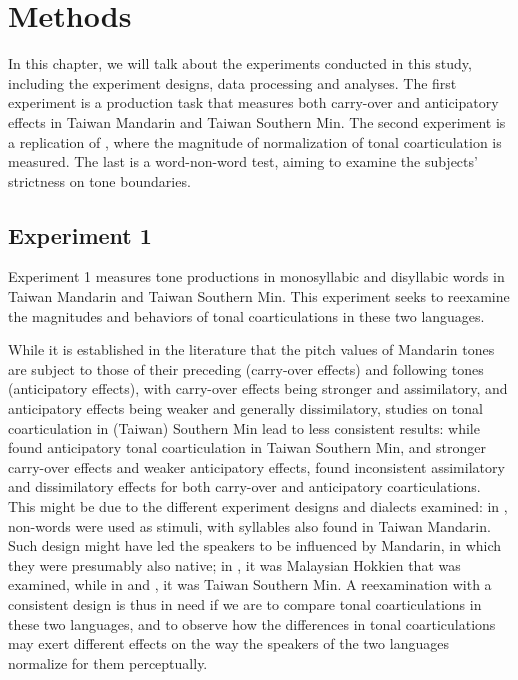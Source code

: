 \chapter{Methods}\label{chapter:Methods}

In this chapter, we will talk about the experiments conducted in this study, including the experiment designs, data processing and analyses. The first experiment is a production task that measures both carry-over and anticipatory effects in Taiwan Mandarin and Taiwan Southern Min. The second experiment is a replication of \cite{Zhangetal2022}, where the magnitude of normalization of tonal coarticulation is measured. The last is a word-non-word test, aiming to examine the subjects' strictness on tone boundaries.


\section{Experiment 1}
Experiment 1 measures tone productions in monosyllabic and disyllabic words in Taiwan Mandarin and Taiwan Southern Min. This experiment seeks to reexamine the magnitudes and behaviors of tonal coarticulations in these two languages.

While it is established in the literature that the pitch values of Mandarin tones are subject to those of their preceding (carry-over effects) and following tones (anticipatory effects), with carry-over effects being stronger and assimilatory, and anticipatory effects being weaker and generally dissimilatory, studies on tonal coarticulation in (Taiwan) Southern Min lead to less consistent results: while \cite{Peng1997} found anticipatory tonal coarticulation in Taiwan Southern Min, and \cite{Wang2002} stronger carry-over effects and weaker anticipatory effects, \cite{ChangHsieh2012} found inconsistent assimilatory and dissimilatory effects for both carry-over and anticipatory coarticulations. This might be due to the different experiment designs and dialects examined: in \cite{Wang2002}, non-words were used as stimuli, with syllables also found in Taiwan Mandarin. Such design might have led the speakers to be influenced by Mandarin, in which they were presumably also native; in \cite{ChangHsieh2012}, it was Malaysian Hokkien that was examined, while in \cite{Peng1997} and \cite{Wang2002}, it was Taiwan Southern Min. A reexamination with a consistent design is thus in need if we are to compare tonal coarticulations in these two languages, and to observe how the differences in tonal coarticulations may exert different effects on the way the speakers of the two languages normalize for them perceptually.

